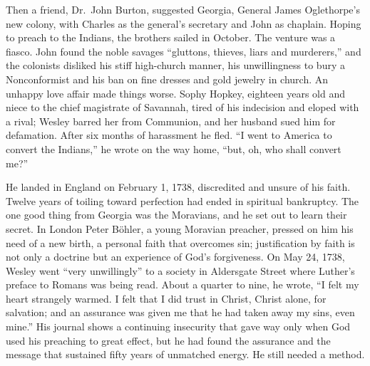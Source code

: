Then a friend, Dr.~John Burton, suggested Georgia, General James Oglethorpe's new colony, with Charles
as the general's secretary and John as chaplain. Hoping to preach to the Indians, the brothers sailed
in October. The venture was a fiasco. John found the noble savages ``gluttons, thieves, liars and
murderers,'' and the colonists disliked his stiff high-church manner, his unwillingness to bury a
Nonconformist and his ban on fine dresses and gold jewelry in church. An unhappy love affair made
things worse. Sophy Hopkey, eighteen years old and niece to the chief magistrate of Savannah, tired of his
indecision and eloped with a rival; Wesley barred her from Communion, and her husband sued him for
defamation. After six months of harassment he fled. ``I went to America to convert the Indians,'' he
wrote on the way home, ``but, oh, who shall convert me?''

He landed in England on February 1, 1738, discredited and unsure of his faith. Twelve years of
toiling toward perfection had ended in spiritual bankruptcy. The one good thing from Georgia was the
Moravians, and he set out to learn their secret. In London Peter B\"ohler, a young Moravian preacher,
pressed on him his need of a new birth, a personal faith that overcomes sin; justification by faith
is not only a doctrine but an experience of God's forgiveness. On May 24, 1738, Wesley went ``very
unwillingly'' to a society in Aldersgate Street where Luther's preface to Romans was being read.
About a quarter to nine, he wrote, ``I felt my heart strangely warmed. I felt that I did trust in
Christ, Christ alone, for salvation; and an assurance was given me that he had taken away my sins,
even mine.'' His journal shows a continuing insecurity that gave way only when God used his preaching
to great effect, but he had found the assurance and the message that sustained fifty years of
unmatched energy. He still needed a method.

